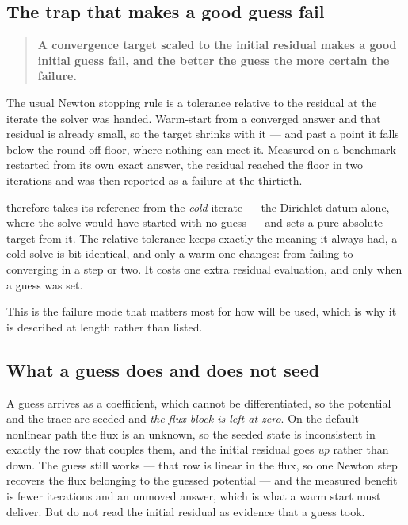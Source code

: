 \subsection{The trap that makes a good guess fail}

\begin{quote}
	\textbf{A convergence target scaled to the initial residual makes a good
	initial guess fail, and the better the guess the more certain the failure.}
\end{quote}

The usual Newton stopping rule is a tolerance relative to the residual at the
iterate the solver was handed. Warm-start from a converged answer and that
residual is already small, so the target shrinks with it --- and past a point it
falls below the round-off floor, where nothing can meet it. Measured on a
benchmark restarted from its own exact answer, the residual reached the floor in
two iterations and was then reported as a failure at the thirtieth.

{\meq} therefore takes its reference from the \emph{cold} iterate --- the
Dirichlet datum alone, where the solve would have started with no guess --- and
sets a pure absolute target from it. The relative tolerance keeps exactly the
meaning it always had, a cold solve is bit-identical, and only a warm one
changes: from failing to converging in a step or two. It costs one extra residual
evaluation, and only when a guess was set.

This is the failure mode that matters most for how {\meq} will be used, which is
why it is described at length rather than listed.

\subsection{What a guess does and does not seed}

A guess arrives as a coefficient, which cannot be differentiated, so the
potential and the trace are seeded and \emph{the flux block is left at zero}. On
the default nonlinear path the flux is an unknown, so the seeded state is
inconsistent in exactly the row that couples them, and the initial residual goes
\emph{up} rather than down. The guess still works --- that row is linear in the
flux, so one Newton step recovers the flux belonging to the guessed potential ---
and the measured benefit is fewer iterations and an unmoved answer, which is what
a warm start must deliver. But do not read the initial residual as evidence that
a guess took.

